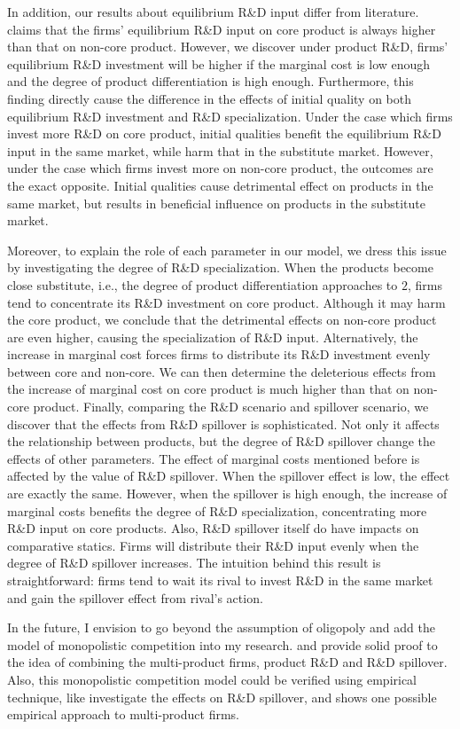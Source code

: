 \documentclass[12pt]{article}
\begin{document}
In addition, our results about equilibrium R\&D input differ from literature.
\textcite{lin_effects_2013} claims that the firms' equilibrium R\&D input on core product is always higher than that on non-core product.
However, we discover under product R\&D, firms' equilibrium R\&D investment will be higher if the marginal cost is low enough and the degree of product differentiation is high enough.
Furthermore, this finding directly cause the difference in the effects of initial quality on both equilibrium R\&D investment and R\&D specialization.
Under the case which firms invest more R\&D on core product, initial qualities benefit the equilibrium R\&D input in the same market, while harm that in the substitute market.
However, under the case which firms invest more on non-core product, the outcomes are the exact opposite.
Initial qualities cause detrimental effect on products in the same market, but results in beneficial influence on products in the substitute market.

Moreover, to explain the role of each parameter in our model, we dress this issue by investigating the degree of R\&D specialization.
When the products become close substitute, i.e., the degree of product differentiation approaches to $2$, firms tend to concentrate its R\&D investment on core product.
Although it may harm the core product, we conclude that the detrimental effects on non-core product are even higher, causing the specialization of R\&D input.
Alternatively, the increase in marginal cost forces firms to distribute its R\&D investment evenly between core and non-core.
We can then determine the deleterious effects from the increase of marginal cost on core product is much higher than that on non-core product.
Finally, comparing the R\&D scenario and spillover scenario, we discover that the effects from R\&D spillover is sophisticated.
Not only it affects the relationship between products, but the degree of R\&D spillover change the effects of other parameters.
The effect of marginal costs mentioned before is affected by the value of R\&D spillover.
When the spillover effect is low, the effect are exactly the same.
However, when the spillover is high enough, the increase of marginal costs benefits the degree of R\&D specialization, concentrating more R\&D input on core products.
Also, R\&D spillover itself do have impacts on comparative statics.
Firms will distribute their R\&D input evenly when the degree of R\&D spillover increases.
The intuition behind this result is straightforward: firms tend to wait its rival to invest R\&D in the same market and gain the spillover effect from rival's action.

In the future, I envision to go beyond the assumption of oligopoly and add the model of monopolistic competition into my research.
\textcite{feenstra_optimal_2007} and \textcite{ushchev_multi-product_2017} provide solid proof to the idea of combining the multi-product firms, product R\&D and R\&D spillover.
Also, this monopolistic competition model could be verified using empirical technique, like \textcite{bloom_identifying_2013} investigate the effects on R\&D spillover, and \textcite{bernard_multiple-product_2010} shows one possible empirical approach to multi-product firms.

\printbibliography
\end{document}
